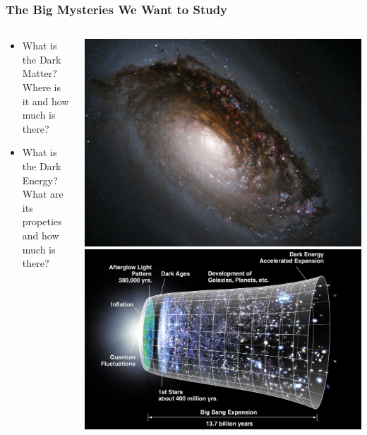 \documentclass{beamer}
\begin{document}
\frame
{

    \frametitle{The Big Mysteries We Want to Study}


    \begin{columns}
        \begin{column}{0.5\textwidth}
            \begin{itemize}


                \item What is the Dark Matter?  Where is it and how much
                    is there?

                \item What is the Dark Energy?  What are its propeties and how
                    much is there?

            \end{itemize}
        \end{column}
        \begin{column}{0.5\textwidth}
            \begin{center}
                \includegraphics[width=\textwidth]{m64-black-eye-galaxy.jpg}
                \includegraphics[width=\textwidth]{CMB_Timeline300_no_WMAP.jpg}
            \end{center}
            
        \end{column}
    \end{columns}


}
\end{document}
